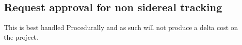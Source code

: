 
\subsection{Request approval for non sidereal tracking} \label{sec:7request}

This is best handled Procedurally and as such will not produce a delta cost on the project.
